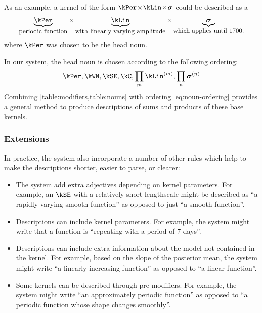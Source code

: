 As an example, a kernel of the form $\kPer \kerntimes  \kLin \kerntimes \boldsymbol{\sigma}$ could be described as a
\begin{align*}
\underbrace{\kPer}_{\textnormal{\small periodic function}} \times 
\underbrace{\kLin}_{\textnormal{\small with linearly varying amplitude}} \times 
\underbrace{\boldsymbol{\sigma}}_{\textnormal{\small which applies until 1700.}}
\end{align*}
where $\kPer$ was chosen to be the head noun.

In our system, the head noun is chosen according to the following ordering:
\begin{align}
\kPer, \kWN, \kSE, \kC, \prod_m \kLin^{(m)}, \prod_n \boldsymbol\sigma^{(n)}
\label{eq:noun-ordering}
\end{align}
Combining \cref{table:modifiers,table:nouns} with ordering \ref{eq:noun-ordering} provides a general method to produce descriptions of sums and products of these base kernels.

\subsubsection{Extensions}

In practice, the system also incorporate a number of other rules which help to make the descriptions shorter, easier to parse, or clearer:
\begin{itemize}
  \item The system add extra adjectives depending on kernel parameters.
        For example, an $\kSE$ with a relatively short lengthscale might be described as ``a rapidly-varying smooth function'' as opposed to just ``a smooth function''.
  \item Descriptions can include kernel parameters.
        For example, the system might write that a function is ``repeating with a period of 7 days''.
  \item Descriptions can include extra information about the model not contained in the kernel.
        For example, based on the slope of the posterior mean, the system might write ``a linearly increasing function'' as opposed to ``a linear function''.
  \item Some kernels can be described through pre-modifiers.
        For example, the system might write ``an approximately periodic function'' as opposed to ``a periodic function whose shape changes smoothly''.
\end{itemize}

